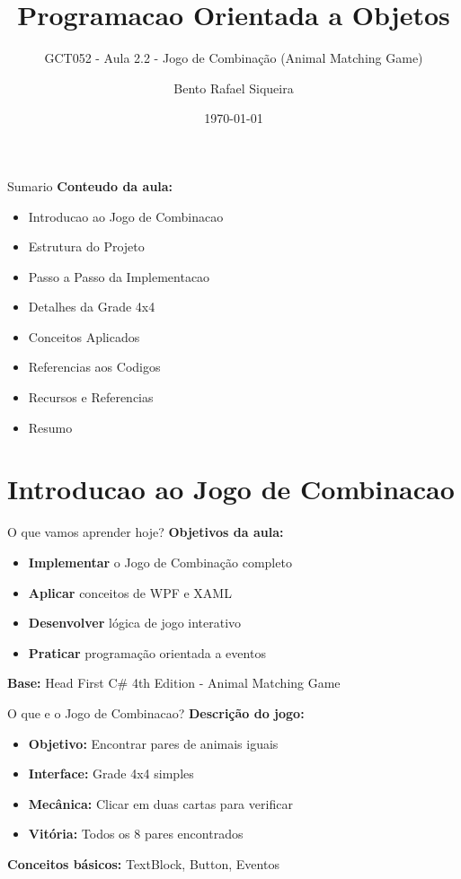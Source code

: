 \documentclass[aspectratio=169]{beamer}
\title{Programacao Orientada a Objetos}
\subtitle{GCT052 - Aula 2.2 - Jogo de Combinação (Animal Matching Game)}
\author{Bento Rafael Siqueira}
\institute{Universidade Federal de Lavras (UFLA)}
\date{\today}
\begin{document}
\begin{frame}
\titlepage
\end{frame}

\begin{frame}{Sumario}
\textbf{Conteudo da aula:}
\begin{itemize}
    \item Introducao ao Jogo de Combinacao
    \item Estrutura do Projeto
    \item Passo a Passo da Implementacao
    \item Detalhes da Grade 4x4
    \item Conceitos Aplicados
    \item Referencias aos Codigos
    \item Recursos e Referencias
    \item Resumo
\end{itemize}
\end{frame}

\section{Introducao ao Jogo de Combinacao}

\begin{frame}{O que vamos aprender hoje?}
\textbf{Objetivos da aula:}
\begin{itemize}
    \item \textbf{Implementar} o Jogo de Combinação completo
    \item \textbf{Aplicar} conceitos de WPF e XAML
    \item \textbf{Desenvolver} lógica de jogo interativo
    \item \textbf{Praticar} programação orientada a eventos
\end{itemize}

\textbf{Base:} Head First C\# 4th Edition - Animal Matching Game
\end{frame}

\begin{frame}{O que e o Jogo de Combinacao?}
\textbf{Descrição do jogo:}
\begin{itemize}
    \item \textbf{Objetivo:} Encontrar pares de animais iguais
    \item \textbf{Interface:} Grade 4x4 simples
    \item \textbf{Mecânica:} Clicar em duas cartas para verificar
    \item \textbf{Vitória:} Todos os 8 pares encontrados
\end{itemize}

\textbf{Conceitos básicos:} TextBlock, Button, Eventos
\end{frame}
\end{document}
